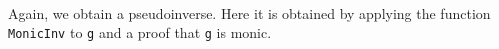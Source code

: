 \begin{code}%
\>[0]\<%
\\
\>[0][@{}l@{\AgdaIndent{1}}]%
\>[1]\AgdaSpace{}%
\AgdaSymbol{:}\AgdaSpace{}%
\AgdaSymbol{\{}\AgdaSpace{}%
\AgdaSymbol{:}\AgdaSpace{}%
\AgdaSpace{}%
\AgdaSpace{}%
\AgdaSymbol{\}}\AgdaSpace{}%
\AgdaSymbol{\{}\AgdaSpace{}%
\AgdaSymbol{:}\AgdaSpace{}%
\AgdaSpace{}%
\AgdaSpace{}%
\AgdaSymbol{\}(}\AgdaSpace{}%
\AgdaSymbol{:}\AgdaSpace{}%
\AgdaSpace{}%
\AgdaSpace{}%
\AgdaSymbol{)}\AgdaSpace{}%
\AgdaSpace{}%
\AgdaSpace{}%
\AgdaSpace{}%
\AgdaSpace{}%
\<%
\\
%
\>[1]\AgdaSpace{}%
\AgdaSpace{}%
\AgdaSymbol{=}\AgdaSpace{}%
\AgdaSpace{}%
\AgdaSpace{}%
\AgdaSpace{}%
\AgdaSpace{}%
\AgdaSpace{}%
\AgdaSpace{}%
\AgdaSpace{}%
\AgdaSpace{}%
\AgdaSpace{}%
\AgdaSpace{}%
\AgdaSpace{}%
\AgdaSpace{}%
\<%
\\
\>[0]\<%
\end{code}

Again, we obtain a pseudoinverse. Here it is obtained by applying the
function \texttt{MonicInv} to \texttt{g} and a proof that \texttt{g} is
monic.

